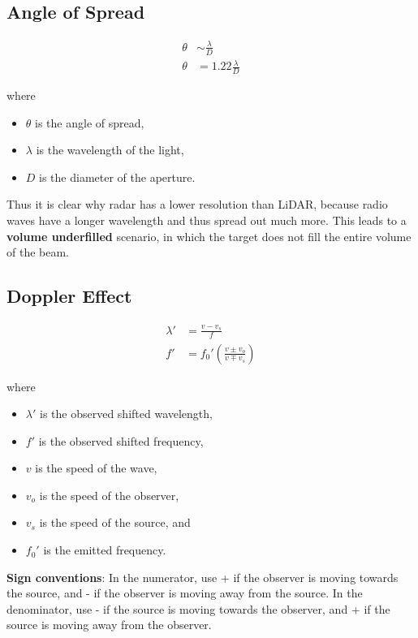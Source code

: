\subsection{Angle of Spread}

\begin{align*}
    \theta & \sim \frac{\lambda}{D}                                 \\
    \theta & = 1.22 \frac{\lambda}{D} \tag*{for circular apertures}
\end{align*}

where

\begin{itemize}
    \item $\theta$ is the angle of spread,
    \item $\lambda$ is the wavelength of the light,
    \item $D$ is the diameter of the aperture.
\end{itemize}

Thus it is clear why radar has a lower resolution than LiDAR, because radio waves have a longer wavelength and thus spread out much more. This leads to a \textbf{volume underfilled} scenario, in which the target does not fill the entire volume of the beam.

\subsection{Doppler Effect}

\begin{align*}
    \lambda' & = \frac{v - v_s}{f}                 \\
    f'       & = f_0'(\frac{v \pm v_o}{v \mp v_s})
\end{align*}

where

\begin{itemize}
    \item $\lambda'$ is the observed shifted wavelength,
    \item $f'$ is the observed shifted frequency,
    \item $v$ is the speed of the wave,
    \item $v_o$ is the speed of the observer,
    \item $v_s$ is the speed of the source, and
    \item $f_0'$ is the emitted frequency.
\end{itemize}

\textbf{Sign conventions}: In the numerator, use + if the observer is moving towards the source, and - if the observer is moving away from the source. In the denominator, use - if the source is moving towards the observer, and + if the source is moving away from the observer.

